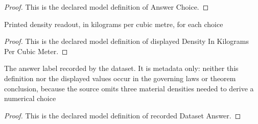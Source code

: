\begin{proof}
  This is the declared model definition of Answer Choice.
\end{proof}
\begin{definition}
  \label{def:physics:phyx-mini-0380:phyxminiproblems-problemphyxmini0380-displayeddensityinkilogramspercubicmeter}
  Printed density readout, in kilograms per cubic metre, for each choice
\end{definition}
\begin{proof}
  This is the declared model definition of displayed Density In Kilograms Per Cubic Meter.
\end{proof}
\begin{definition}
  \label{def:physics:phyx-mini-0380:phyxminiproblems-problemphyxmini0380-recordeddatasetanswer}
  The answer label recorded by the dataset. It is metadata only: neither this definition nor the displayed values occur in the governing laws or theorem conclusion, because the source omits three material densities needed to derive a numerical choice
\end{definition}
\begin{proof}
  This is the declared model definition of recorded Dataset Answer.
\end{proof}
